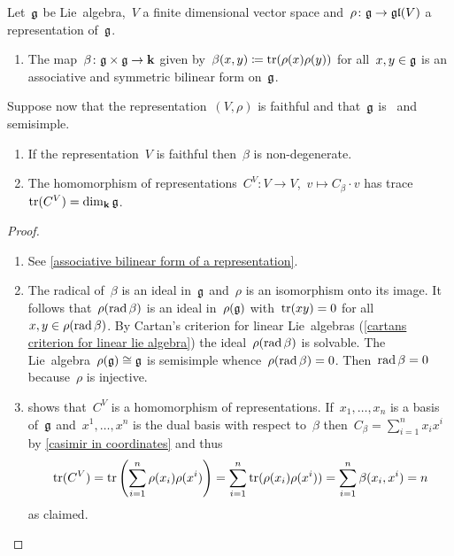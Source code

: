 \begin{lemma}
  \label{construction of casimir endomorphism}
  Let~$\mathfrak{g}$ be Lie~algebra,~$V$ a finite dimensional vector space and~$\rho \colon \mathfrak{g} \to \mathfrak{gl}(V)$ a representation of~$\mathfrak{g}$.
  \begin{enumerate}
    \item
      The map~$\beta \colon \mathfrak{g} \times \mathfrak{g} \to \mathbf{k}$ given by~$\beta(x,y) \coloneqq \operatorname{tr}(\rho(x)\rho(y))$ for all~$x,y \in \mathfrak{g}$ is an associative and symmetric bilinear form on~$\mathfrak{g}$.
  \end{enumerate}
  Suppose now that the representation~$(V,\rho)$ is faithful and that~$\mathfrak{g}$ is~{} and semisimple.
  \begin{enumerate}[resume]
    \item
      If the representation~$V$ is faithful then~$\beta$ is non-degenerate.
    \item
      The homomorphism of representations~$C^V \colon V \to V$,~$v \mapsto C_\beta \cdot v$ has trace~$\operatorname{tr}(C^V) = \dim_{\mathbf{k}} \mathfrak{g}$.
  \end{enumerate}
\end{lemma}


\begin{proof}
  \leavevmode
  \begin{enumerate}
    \item
      See \cref{associative bilinear form of a representation}.
    \item
      The radical of~$\beta$ is an ideal in~$\mathfrak{g}$ and~$\rho$ is an isomorphism onto its image.
      It follows that~$\rho(\operatorname{rad} \beta)$ is an ideal in~$\rho(\mathfrak{g})$ with~$\operatorname{tr}(xy) = 0$ for all~$x,y \in \rho(\operatorname{rad} \beta)$.
      By Cartan’s criterion for linear Lie~algebras (\cref{cartans criterion for linear lie algebra}) the ideal~$\rho(\operatorname{rad} \beta)$ is solvable.
      The Lie~algebra~$\rho(\mathfrak{g}) \cong \mathfrak{g}$ is semisimple whence~$\rho(\operatorname{rad} \beta) = 0$.
      Then~$\operatorname{rad} \beta = 0$ because~$\rho$ is injective.
    \item
       shows that~$C^V$ is a homomorphism of representations.
      If~$x_1, \dotsc, x_n$ is a basis of~$\mathfrak{g}$ and~$x^1, \dotsc, x^n$ is the dual basis with respect to~$\beta$ then~$C_\beta = \sum_{i=1}^n x_i x^i$ by \cref{casimir in coordinates} and thus
      \[
        \operatorname{tr}(C^V)
        =
        \operatorname{tr}\left( \sum_{i=1}^n \rho(x_i)\rho(x^i) \right)
        =
        \sum_{i=1}^n \operatorname{tr}(\rho(x_i)\rho(x^i))
        =
        \sum_{i=1}^n \beta(x_i, x^i)
        =
        n
      \]
      as claimed.
    \qedhere
  \end{enumerate}
\end{proof}


